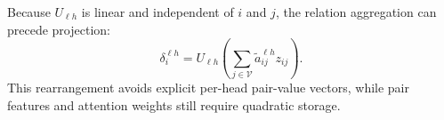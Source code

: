 Because $U_{\ell h}$ is linear and independent of $i$ and $j$, the relation
aggregation can precede projection:
\begin{equation}
 \delta_i^{\ell h}
 =U_{\ell h}\left(\sum_{j\in\mathcal V}
   \widetilde a^{\ell h}_{ij}z_{ij}\right).
 \label{eq:edgevalue-efficient}
\end{equation}
This rearrangement avoids explicit per-head pair-value vectors, while pair
features and attention weights still require quadratic storage.
